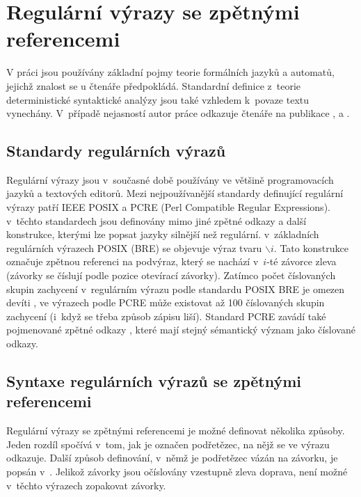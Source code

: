 \documentclass[thesis=B,czech]{FITthesis}[2019/12/23]
\theoremstyle{definition}
\begin{document}
\chapter{Regulární výrazy se zpětnými referencemi}

V práci jsou používány základní pojmy teorie formálních jazyků a automatů, jejichž znalost se u čtenáře předpokládá. Standardní definice z~teorie deterministické syntaktické analýzy jsou také vzhledem k~povaze textu vynechány. V~případě nejasností autor práce odkazuje čtenáře na publikace \cite{hopcroft}, \cite{sestakova} a \cite{aho_lam_sethi_ullman_2007}.
\section{Standardy regulárních výrazů}
Regulární výrazy jsou v~současné době používány ve většině programovacích jazyků a textových editorů. Mezi nejpoužívanější standardy definující regulární výrazy patří IEEE POSIX a PCRE (Perl Compatible Regular Expressions). v~těchto standardech jsou definovány mimo jiné zpětné odkazy a další konstrukce, kterými lze popsat jazyky silnější než regulární. v~základních regulárních výrazech POSIX (BRE) se objevuje výraz tvaru $\backslash i$. Tato konstrukce označuje zpětnou referenci na podvýraz, který se nachází v~$i$-té závorce zleva (závorky se číslují podle pozice otevírací závorky). Zatímco počet číslovaných skupin zachycení v~regulárním výrazu podle standardu POSIX BRE je omezen devíti \cite[s. 233]{posix}, ve výrazech podle PCRE může existovat až 100 číslovaných skupin zachycení (i~když se třeba způsob zápisu liší). Standard PCRE zavádí také pojmenované zpětné odkazy \cite{pcre}, které mají stejný sémantický význam jako číslované odkazy.
\section{Syntaxe regulárních výrazů se zpětnými referencemi}

Regulární výrazy se zpětnými referencemi je možné definovat několika způsoby. Jeden rozdíl spočívá v~tom, jak je označen podřetězec, na nějž se ve výrazu odkazuje. Další způsob definování, v~němž je podřetězec vázán na závorku, je popsán v~\cite{campeanu}. Jelikož závorky jsou očíslovány vzestupně zleva doprava, není možné v~těchto výrazech zopakovat  závorky.
\end{document}
